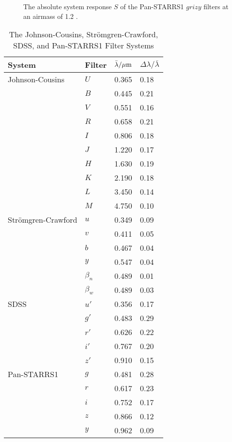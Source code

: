 \begin{figure}
\footnotesize
{}
\caption{The absolute system response $S$ of the Pan-STARRS1 $grizy$ filters  at an airmass of 1.2 \citep{Tonry-2012}.}
\label{figure-S-grizy}
\end{figure}

\begin{table}
\centering
\caption{The Johnson-Cousins, Strömgren-Crawford, SDSS, and Pan-STARRS1 Filter Systems}
\medskip
\label{table-filters}
\begin{tabular}{llll}
\hline
System&Filter    &$\bar\lambda/\mbox{$\mu$m}$&$\Delta\lambda/\bar\lambda$\\
\hline
Johnson-Cousins
&$U$     &0.365  &0.18\\
&$B$     &0.445  &0.21\\
&$V$     &0.551  &0.16\\
&$R$     &0.658  &0.21\\
&$I$     &0.806  &0.18\\
&$J$     &1.220  &0.17\\
&$H$     &1.630  &0.19\\
&$K$     &2.190  &0.18\\
&$L$     &3.450  &0.14\\
&$M$     &4.750  &0.10\\
\hline
Strömgren-Crawford
&$u$     &0.349  &0.09\\
&$v$     &0.411  &0.05\\
&$b$     &0.467  &0.04\\
&$y$     &0.547  &0.04\\
&$\beta_n$&0.489 &0.01\\
&$\beta_w$&0.489 &0.03\\
\hline
SDSS
&$u'$		  &0.356	&0.17\\
&$g'$			&0.483	&0.29\\
&$r'$			&0.626	&0.22\\
&$i'$			&0.767	&0.20\\
&$z'$			&0.910	&0.15\\
\hline
Pan-STARRS1
&$g$			&0.481	&0.28\\
&$r$			&0.617	&0.23\\
&$i$			&0.752	&0.17\\
&$z$			&0.866	&0.12\\
&$y$			&0.962	&0.09\\
\hline
\end{tabular}
\end{table}

